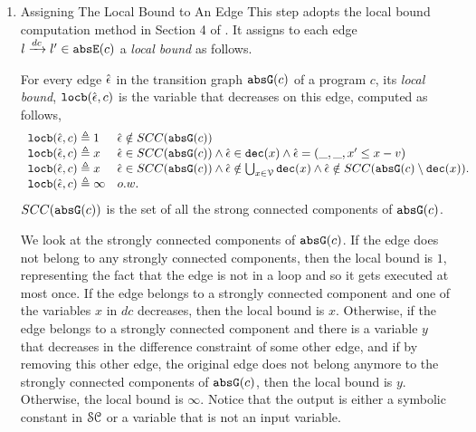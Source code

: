\begin{enumerate}
\item {Assigning The Local Bound to An Edge}
This step adopts the local bound computation method in Section 4 of \cite{sinn2017complexity}.
It assigns to each edge  $l \xrightarrow{dc} l'\in \mathtt{abs}{\mathtt{E}}(c)$ a \emph{local bound} as follows.
\begin{defn}
  \label{def:ranking_gen}
For every edge $\hat{\mathtt{\epsilon}{}}$ in the transition graph $\mathtt{abs}{\mathtt{G}}(c)$ of a program $c$,
its \emph{local bound}, $\mathtt{locb}(\hat{\mathtt{\epsilon}{}}, c)$
is the variable that decreases on this edge, computed as follows,
%
\[ 
\begin{array}{ll}
  \mathtt{locb}(\hat{\mathtt{\epsilon}{}}, c) \triangleq 1 
  & \hat{\mathtt{\epsilon}{}} \notin SCC(\mathtt{abs}{\mathtt{G}}(c))
  \\
  \mathtt{locb}(\hat{\mathtt{\epsilon}{}}, c) \triangleq x
  & \hat{\mathtt{\epsilon}{}} \in SCC(\mathtt{abs}{\mathtt{G}}(c)) \land \hat{\mathtt{\epsilon}{}} \in \mathtt{dec}(x) \land  \hat{\mathtt{\epsilon}{}} = (\_, \_ , x' \leq x - v) \\
  \mathtt{locb}(\hat{\mathtt{\epsilon}{}}, c) \triangleq x
  & \hat{\mathtt{\epsilon}{}} \in SCC(\mathtt{abs}{\mathtt{G}}(c)) \land 
  \hat{\mathtt{\epsilon}{}}  \notin \bigcup_{x \in \mathcal{V}} \mathtt{dec}(x)
  \land \hat{\mathtt{\epsilon}{}} \notin SCC(\mathtt{abs}{\mathtt{G}}(c) \setminus \mathtt{dec}(x)). \\
  \mathtt{locb}(\hat{\mathtt{\epsilon}{}}, c) \triangleq \infty  & o.w.
\end{array}
\]
$SCC(\mathtt{abs}{\mathtt{G}}(c))$ is the set of all the strong connected components of $\mathtt{abs}{\mathtt{G}}(c)$.
\end{defn}
We look at the strongly connected components of $\mathtt{abs}{\mathtt{G}}(c)$. 
If the edge does not belong to any strongly connected components, then the local bound is $1$, representing the fact that the edge is not in a loop and so it gets executed at most once.
If the edge belongs to a strongly connected component and one of the variables $x$ in $dc$ decreases, then the local bound is $x$.
Otherwise, if the edge belongs to a strongly connected component and there is a variable $y$ that decreases in the difference constraint of some other edge, and if by removing this other edge, the original edge does not belong anymore to the strongly connected components of $\mathtt{abs}{\mathtt{G}}(c)$, then the local bound is $y$.
Otherwise, the local bound is $\infty$. 
Notice that the output is either a symbolic constant in $\mathcal{SC}$ or a variable that is not an input variable.


\end{enumerate}
